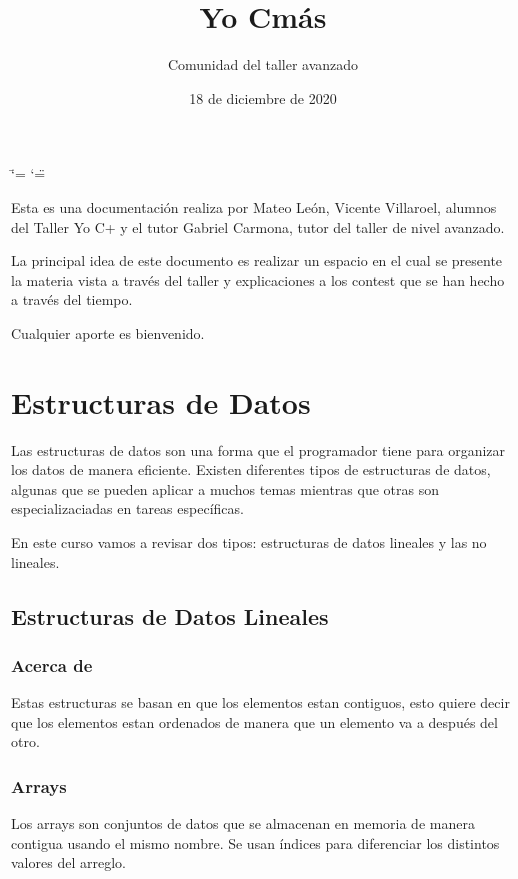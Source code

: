 \documentclass[letterpaper,10pt,spanish]{sphinxmanual}
\title{Yo Cmás}
\date{18 de diciembre de 2020}
\author{Comunidad del taller avanzado}
\begin{document}
\ifdefined\shorthandoff
  \ifnum\catcode`\=\string=\active\shorthandoff{=}\fi
  \ifnum\catcode`\"=\active{}\fi
\fi

\pagestyle{empty}
\sphinxmaketitle
\pagestyle{plain}
\sphinxtableofcontents
\pagestyle{normal}
\label{\detokenize{index::doc}}


Esta es una documentación realiza por Mateo León, Vicente Villaroel, alumnos del Taller Yo C+ y el tutor Gabriel Carmona, tutor del taller de nivel avanzado.

La principal idea de este documento es realizar un espacio en el cual se presente la materia vista a través del taller y explicaciones a los contest que se han hecho a través del tiempo.

Cualquier aporte es bienvenido.


\chapter{Estructuras de Datos}
\label{\detokenize{edd/edd:estructuras-de-datos}}\label{\detokenize{edd/edd::doc}}
Las estructuras de datos son una forma que el programador tiene para organizar los datos de manera eficiente. Existen diferentes tipos de estructuras de datos, algunas que se pueden aplicar a muchos temas mientras que otras son especializaciadas en tareas específicas.

En este curso vamos a revisar dos tipos: estructuras de datos lineales y las no lineales.


\section{Estructuras de Datos Lineales}
\label{\detokenize{edd/lineales:estructuras-de-datos-lineales}}\label{\detokenize{edd/lineales::doc}}

\subsection{Acerca de}
\label{\detokenize{edd/lineales:acerca-de}}
Estas estructuras se basan en que los elementos estan contiguos, esto quiere decir que los elementos estan ordenados de manera que un elemento va a después del otro.


\subsection{Arrays}
\label{\detokenize{edd/lineales:arrays}}
Los arrays son conjuntos de datos que se almacenan en memoria de manera contigua usando el mismo nombre. Se usan índices para diferenciar los distintos valores del arreglo.
\end{document}
